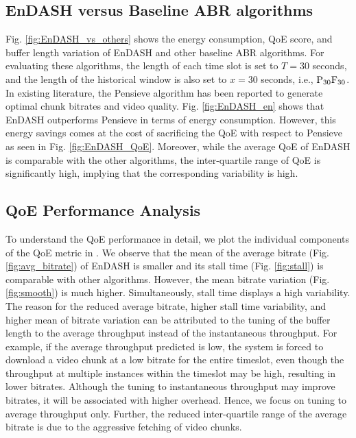 \subsection{EnDASH versus Baseline ABR algorithms}
Fig. \ref{fig:EnDASH_vs_others} shows the energy consumption, \ac{QoE} score, and buffer length variation of EnDASH and other baseline \ac{ABR} algorithms. For evaluating these algorithms, the length of each time slot is set to $T=30$ seconds, and the length of the historical window is also set to $x=30$ seconds, i.e., $\mathrm{P_{30}F_{30}}$. %
In existing literature, the Pensieve \cite{mao2017neural} algorithm has been reported to generate optimal chunk bitrates and video quality. Fig. \ref{fig:EnDASH_en} shows that EnDASH outperforms Pensieve in terms of energy consumption. However, this energy savings comes at the cost of sacrificing the \ac{QoE} with respect to Pensieve as seen in Fig. \ref{fig:EnDASH_QoE}. Moreover, while the average QoE of EnDASH is comparable with the other algorithms, the inter-quartile range of \ac{QoE} is significantly high, implying that the corresponding variability is high.  
 \subsection{QoE Performance Analysis}
To understand the \ac{QoE} performance in detail, we plot the individual components of the \ac{QoE} metric in \fig{\ref{fig:indi_QoE}}. We observe that the mean of the average bitrate (Fig. \ref{fig:avg_bitrate}) of EnDASH is smaller and its stall time (Fig. \ref{fig:stall}) is comparable with other algorithms. However, the mean bitrate variation (Fig. \ref{fig:smooth}) is much higher. Simultaneously, stall time displays a high variability. The reason for the reduced average bitrate, higher stall time variability, and higher mean of bitrate variation can be attributed to the tuning of the buffer length to the average throughput instead of the instantaneous throughput. For example, if the average throughput predicted is low, the system is forced to download a video chunk at a low bitrate for the entire timeslot, even though the throughput at multiple instances within the timeslot may be high, resulting in lower bitrates. Although the tuning to instantaneous throughput may improve bitrates, it will be associated with higher overhead. Hence, we focus on tuning to average throughput only. Further, the reduced inter-quartile range of the average bitrate is due to the aggressive fetching of video chunks. 
